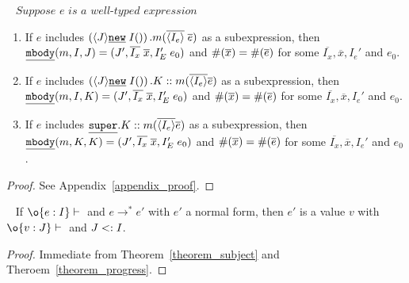 \begin{theorem}[Progress]~\label{theorem_progress}
$\textit{Suppose } e \textit{ is a well-typed expression } $ \\
\begin{enumerate}
\item If $e$ includes $\left(\langle J \rangle\emph{\texttt{new}}\;I()\right).m(\overline{\langle I_e \rangle} \; \overline{e})$ as a subexpression,
    then $ \emph{\texttt{mbody}}(m, I, J) = (J', \overline{I_x} \; \overline{x}, I'_E \; e_0) $ and
         $\#(\overline{x}) = \#(\overline{e})$ for some $\overline{I_x}, \overline{x}, I_e'$ and $e_0$.
\item If $e$ includes $\left(\langle J \rangle\emph{\texttt{new}}\;I()\right).K::m(\overline{\langle I_e \rangle} \overline{e})$ as a subexpression,
    then $ \emph{\texttt{mbody}}(m, I, K) = (J', \overline{I_x} \; \overline{x}, I'_E \; e_0) $ and 
         $\#(\overline{x}) = \#(\overline{e})$ for some $\overline{I_x}, \overline{x}, I_e'$ and $e_0$.
\item If $e$ includes $\emph{\texttt{super}}.K::m(\overline{\langle I_e \rangle} \overline{e})$ as a subexpression,
    then $ \emph{\texttt{mbody}}(m, K, K) = (J', \overline{I_x} \; \overline{x}, I'_E \; e_0) $ and 
         $\#(\overline{x}) = \#(\overline{e})$ for some $\overline{I_x}, \overline{x}, I_e'$ and $e_0$.
\end{enumerate}
\end{theorem}
\begin{proof}
See Appendix~\ref{appendix_proof}.
\end{proof}

\begin{theorem}~\label{theorem_soundness}
If $\judgeewf \o {e : I}$ and $e \to^* e'$ with $e'$ a normal form, then $e'$ is 
a value $v$ with $\judgeewf \o {v:J}$ and $J <: I$.
\end{theorem}
\begin{proof}
Immediate from Theorem~\ref{theorem_subject} and Theroem~\ref{theorem_progress}.
\end{proof}
